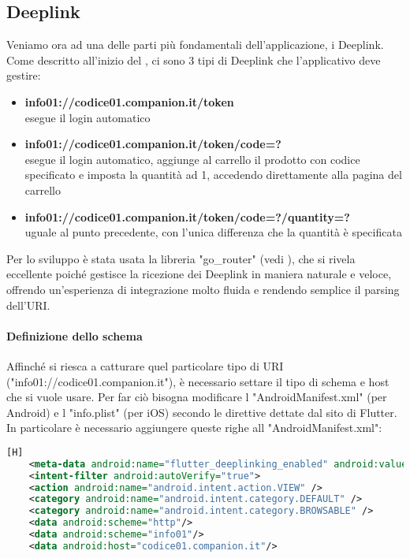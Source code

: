\noindent

\subsection{Deeplink}\label{sub:deeplink}
Veniamo ora ad una delle parti più fondamentali dell'applicazione, i Deeplink. Come descritto all'inizio del , ci sono 3 tipi di Deeplink che l'applicativo deve gestire:
\begin{itemize}
\item \textbf{info01://codice01.companion.it/token}\\ esegue il login automatico
\item \textbf{info01://codice01.companion.it/token/code=?}\\ esegue il login automatico, aggiunge al carrello il prodotto con codice specificato e imposta la quantità ad 1, accedendo direttamente alla pagina del carrello
\item \textbf{info01://codice01.companion.it/token/code=?/quantity=?}\\ uguale al punto precedente, con l'unica differenza che la quantità è specificata
\end{itemize}

\noindent
Per lo sviluppo è stata usata la libreria "go\_router" (vedi ), che si rivela eccellente poiché gestisce la ricezione dei Deeplink in maniera naturale e veloce, offrendo un'esperienza di integrazione molto fluida e rendendo semplice il parsing dell'URI.
\paragraph{Definizione dello schema} Affinché si riesca a catturare quel particolare tipo di URI ("info01://codice01.companion.it"), è necessario settare il tipo di schema e host che si vuole usare. Per far ciò bisogna modificare l "AndroidManifest.xml" (per Android) e l "info.plist" (per iOS) secondo le direttive dettate dal sito di Flutter.\\
In particolare è necessario aggiungere queste righe all "AndroidManifest.xml":
\begin{lstlisting}[language=XML, style=longBlock, firstnumber=1][H]
	<meta-data android:name="flutter_deeplinking_enabled" android:value="true"/>
	<intent-filter android:autoVerify="true">
	<action android:name="android.intent.action.VIEW" />
	<category android:name="android.intent.category.DEFAULT" />
	<category android:name="android.intent.category.BROWSABLE" />
	<data android:scheme="http"/>
	<data android:scheme="info01"/>
	<data android:host="codice01.companion.it"/>
\end{lstlisting}

